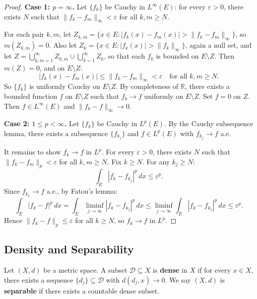 \documentclass[11pt]{report}
\begin{document}
\begin{proof}\leavevmode

\textbf{Case 1: $p = \infty$.} Let $\{f_k\}$ be Cauchy in $L^\infty(E)$: for every $\varepsilon > 0$, there exists $N$ such that $\|f_k - f_m\|_\infty < \varepsilon$ for all $k, m \geq N$.

For each pair $k, m$, let $Z_{k,m} = \{x \in E : |f_k(x) - f_m(x)| > \|f_k - f_m\|_\infty\}$, so $m(Z_{k,m}) = 0$. Also let $Z_k = \{x \in E : |f_k(x)| > \|f_k\|_\infty\}$, again a null set, and let $Z = \bigcup_{k,m=1}^{\infty} Z_{k,m} \cup \bigcup_{k=1}^{\infty} Z_k$, so that each $f_k$ is bounded on $E \setminus Z$. Then $m(Z) = 0$, and on $E \setminus Z$:
\[
|f_k(x) - f_m(x)| \leq \|f_k - f_m\|_\infty < \varepsilon \quad \text{for all } k, m \geq N.
\]
So $\{f_k\}$ is uniformly Cauchy on $E \setminus Z$. By completeness of $\mathbb{R}$, there exists a bounded function $f$ on $E \setminus Z$ such that $f_k \to f$ uniformly on $E \setminus Z$. Set $f = 0$ on $Z$. Then $f \in L^\infty(E)$ and $\|f_k - f\|_\infty \to 0$.

\textbf{Case 2: $1 \leq p < \infty$.} Let $\{f_k\}$ be Cauchy in $L^p(E)$. By the Cauchy subsequence lemma, there exists a subsequence $\{f_{k_j}\}$ and $f \in L^p(E)$ with $f_{k_j} \to f$ a.e.

It remains to show $f_k \to f$ in $L^p$. For every $\varepsilon > 0$, there exists $N$ such that $\|f_k - f_m\|_p < \varepsilon$ for all $k, m \geq N$. Fix $k \geq N$. For any $k_j \geq N$:
\[
\int_E |f_k - f_{k_j}|^p\,dx \leq \varepsilon^p.
\]
Since $f_{k_j} \to f$ a.e., by Fatou's lemma:
\[
\int_E |f_k - f|^p\,dx = \int_E \liminf_{j \to \infty} |f_k - f_{k_j}|^p\,dx \leq \liminf_{j \to \infty} \int_E |f_k - f_{k_j}|^p\,dx \leq \varepsilon^p.
\]
Hence $\|f_k - f\|_p \leq \varepsilon$ for all $k \geq N$, so $f_k \to f$ in $L^p$.
\end{proof}

\subsection{Density and Separability}

\begin{defbox}
Let $(X, d)$ be a metric space. A subset $\mathcal{D} \subseteq X$ is \textbf{dense} in $X$ if for every $x \in X$, there exists a sequence $\{d_j\} \subseteq \mathcal{D}$ with $d(d_j, x) \to 0$. We say $(X, d)$ is \textbf{separable} if there exists a countable dense subset.
\end{defbox}
\end{document}

